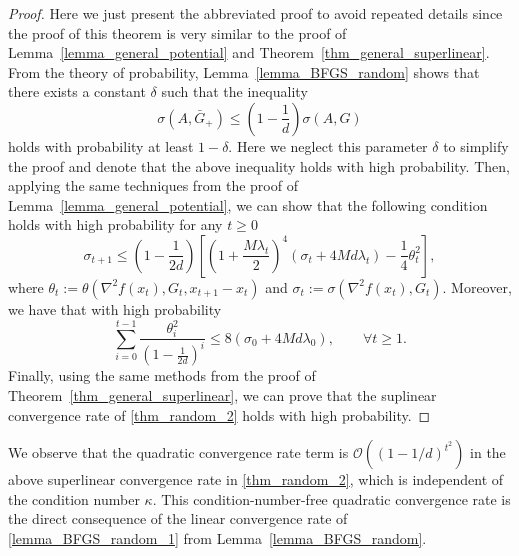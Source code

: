 \documentclass[11pt]{article}
\numberwithin{assumption}{section}
\numberwithin{remark}{section}
\numberwithin{theorem}{section}
\begin{document}
\begin{proof}
Here we just present the abbreviated proof to avoid repeated details since the proof of this theorem is very similar to the proof of Lemma~\ref{lemma_general_potential} and Theorem~\ref{thm_general_superlinear}. From the theory of probability, Lemma~\ref{lemma_BFGS_random} shows that there exists a constant $\delta$ such that the inequality
\begin{equation}
    \sigma(A, \bar{G}_{+}) \leq (1 - \frac{1}{d})\sigma(A, G)
\end{equation}
holds with probability at least $1 - \delta$. Here we neglect this parameter $\delta$ to simplify the proof and denote that the above inequality holds with high probability. Then, applying the same techniques from the proof of Lemma~\ref{lemma_general_potential}, we can show that the following condition holds with high probability for any $t \geq 0$
\begin{equation}
    \sigma_{t+1} \leq (1 - \frac{1}{2d})\left[(1 + \frac{M\lambda_t}{2})^4(\sigma_t + 4Md\lambda_t) - \frac{1}{4}\theta^2_t\right],
\end{equation}
where  $\theta_t := \theta(\nabla^2{f(x_{t})}, G_t, x_{t + 1} - x_{t})$ and $\sigma_t := \sigma(\nabla^2{f(x_{t})}, G_{t})$. Moreover, we have that with high probability
\begin{equation}
    \sum_{i = 0}^{t - 1}\frac{\theta^2_i}{(1 - \frac{1}{2d})^{i}}  \leq 8(\sigma_0 + 4Md\lambda_0), \qquad \forall t \geq 1. 
\end{equation}
Finally, using the same methods from the proof of Theorem~\ref{thm_general_superlinear}, we can prove that the suplinear convergence rate of \eqref{thm_random_2} holds with high probability.
\end{proof}

We observe that the quadratic convergence rate term is $\mathcal{O}((1 - 1/d)^{t^2})$ in the above superlinear convergence rate in \eqref{thm_random_2}, which is independent of the condition number $\kappa$. This condition-number-free quadratic convergence rate is the direct consequence of the linear convergence rate of \eqref{lemma_BFGS_random_1} from Lemma~\ref{lemma_BFGS_random}.
\end{document}
